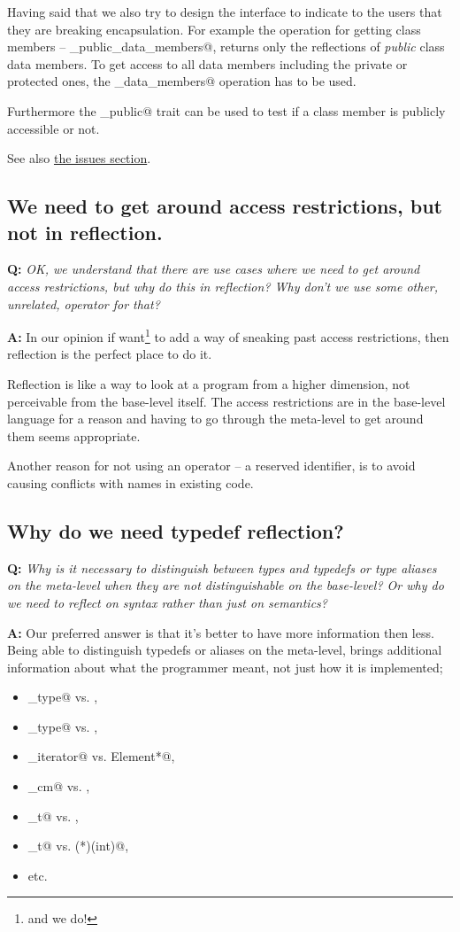 Having said that we also try to design the interface to indicate to the users
that they are breaking encapsulation. For example the  operation
for getting class members -- \verb@get_public_data_members@, returns only the
reflections of {\em public} class data members. To get access to all data members
including the private or protected ones, the \verb@get_data_members@
operation has to be used.

Furthermore the \verb@is_public@ trait can be used to test if a class member
is publicly accessible or not.

See also \hyperref[issue-breaking-access]{the issues section}.

\subsection{We need to get around access restrictions, but not in reflection.}

\textbf{Q:} {\em OK, we understand that there are use cases where we need
to get around access restrictions, but why do this in reflection?
Why don't we use some other, unrelated,  operator for that?}

\textbf{A:}
In our opinion if want\footnote{and we do!} to add a way of sneaking past
access restrictions, then reflection is the perfect place to do it.

Reflection is like a way to look at a program from a higher dimension,
not perceivable from the base-level itself. The access restrictions are in
the base-level language for a reason and having to go through the meta-level
to get around them seems appropriate.

Another reason for not using an operator -- a reserved identifier, is to avoid
causing conflicts with names in existing code.

\subsection{Why do we need typedef reflection?}

\textbf{Q:} {\em Why is it necessary to distinguish between types and typedefs
or type aliases on the meta-level when they are not distinguishable on the
base-level? Or why do we need to reflect on syntax rather than just on semantics?}

\textbf{A:} Our preferred answer is that it's better to have more information
then less. Being able to distinguish typedefs or aliases on the meta-level,
brings additional information about what the programmer meant, not just how
it is implemented;
\begin{itemize}
	\item \verb@size_type@ vs. \verb@unsigned@,
	\item \verb@rank_type@ vs. \verb@short@,
	\item \verb@const_iterator@ vs. \verb@const Element*@,
	\item \verb@height_cm@ vs. \verb@float@,
	\item \verb@pid_t@ vs. \verb@int@,
	\item \verb@sighandler_t@ vs. \verb@void (*)(int)@,
	\item etc.
\end{itemize}

